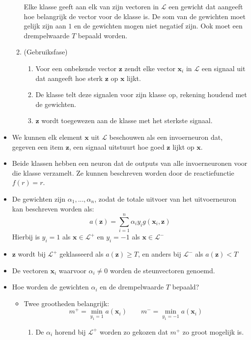 \begin{itemize}
\begin{enumerate}
        Elke klasse geeft aan elk van zijn vectoren in $\mathcal{L}$ een gewicht dat aangeeft hoe belangrijk de vector voor de klasse is. De som van de gewichten moet gelijk zijn aan $1$ en de gewichten mogen niet negatief zijn. Ook moet een drempelwaarde $T$ bepaald worden.
        \item (Gebruiksfase)
        \begin{enumerate}
            \item Voor een onbekende vector $\textbf{z}$ zendt elke vector $\textbf{x}_i$ in $\mathcal{L}$ een signaal uit dat aangeeft hoe sterk $\textbf{z}$ op $\textbf{x}$ lijkt.
            \item De klasse telt deze signalen voor zijn klasse op, rekening houdend met de gewichten.
            \item $\textbf{z}$ wordt toegewezen aan de klasse met het sterkste signaal.
        \end{enumerate}
    \end{enumerate}
    \item We kunnen elk element $\textbf{x}$ uit $\mathcal{L}$ beschouwen als een invoerneuron dat, gegeven een item $\textbf{z}$, een signaal uitstuurt hoe goed $\textbf{z}$ lijkt op $\textbf{x}$.
    \item Beide klassen hebben een neuron dat de outputs van alle invoerneuronen voor die klasse verzamelt. Ze kunnen beschreven worden door de reactiefunctie $f(r) = r$.
    \item De gewichten zijn $\alpha_1, ..., \alpha_n$, zodat de totale uitvoer van het uitvoerneuron kan beschreven worden als:
    $$a(\textbf{z}) = \sum_{i = 1}^{n}\alpha_iy_ig(\textbf{x}_i, \textbf{z})$$
    Hierbij is $y_i = 1$ als $\textbf{x} \in \mathcal{L}^+$ en  $y_i = -1$ als $\textbf{x} \in \mathcal{L}^-$
    \item $\textbf{z}$ wordt bij $\mathcal{L}^+$ geklasseerd als $a(\textbf{z}) \geq T$, en anders bij $\mathcal{L}^-$ als $a(\textbf{z}) < T$
    \item De vectoren $\textbf{x}_i$ waarvoor $\alpha_i \neq 0$ worden de steunvectoren genoemd.
    \item Hoe worden de gewichten $\alpha_i$ en de drempelwaarde $T$ bepaald?
    \begin{itemize}
        \item Twee grootheden belangrijk:
        $$m^+ = \min_{y_1=1} a(\textbf{x}_i) \qquad m^- = \min_{y_1=-1} a(\textbf{x}_i)$$
        \begin{enumerate}
            \item De $\alpha_i$ horend bij $\mathcal{L}^+$ worden zo gekozen dat $m^+$ zo groot mogelijk is.

\end{enumerate}
\end{itemize}
\end{itemize}
